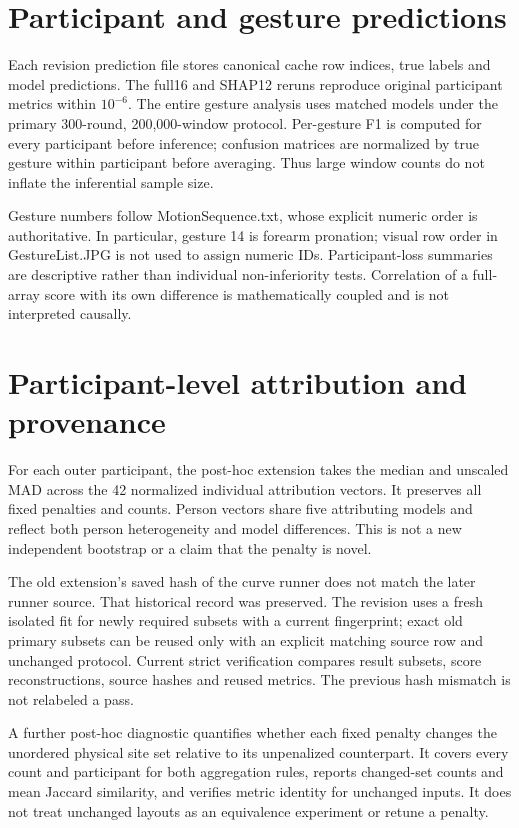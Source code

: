 \documentclass{iopjournal}
\begin{document}
\section{Participant and gesture predictions}
Each revision prediction file stores canonical cache row indices, true labels and model predictions. The full16 and SHAP12 reruns reproduce original participant metrics within $10^{-6}$. The entire gesture analysis uses matched models under the primary 300-round, 200,000-window protocol. Per-gesture F1 is computed for every participant before inference; confusion matrices are normalized by true gesture within participant before averaging. Thus large window counts do not inflate the inferential sample size.

Gesture numbers follow MotionSequence.txt, whose explicit numeric order is authoritative. In particular, gesture 14 is forearm pronation; visual row order in GestureList.JPG is not used to assign numeric IDs. Participant-loss summaries are descriptive rather than individual non-inferiority tests. Correlation of a full-array score with its own difference is mathematically coupled and is not interpreted causally.

\section{Participant-level attribution and provenance}
For each outer participant, the post-hoc extension takes the median and unscaled MAD across the 42 normalized individual attribution vectors. It preserves all fixed penalties and counts. Person vectors share five attributing models and reflect both person heterogeneity and model differences. This is not a new independent bootstrap or a claim that the penalty is novel.

The old extension's saved hash of the curve runner does not match the later runner source. That historical record was preserved. The revision uses a fresh isolated fit for newly required subsets with a current fingerprint; exact old primary subsets can be reused only with an explicit matching source row and unchanged protocol. Current strict verification compares result subsets, score reconstructions, source hashes and reused metrics. The previous hash mismatch is not relabeled a pass.

A further post-hoc diagnostic quantifies whether each fixed penalty changes the unordered physical site set relative to its unpenalized counterpart. It covers every count and participant for both aggregation rules, reports changed-set counts and mean Jaccard similarity, and verifies metric identity for unchanged inputs. It does not treat unchanged layouts as an equivalence experiment or retune a penalty.
\end{document}
